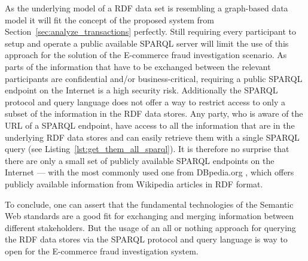 As the underlying model of a \gls{RDF} data set is resembling a graph-based data model it will fit the concept of the proposed system from Section~\ref{sec:analyze_transactions} perfectly. Still requiring every participant to setup and operate a public available \gls{SPARQL} server will limit the use of this approach for the solution of the \gls{E-commerce} fraud investigation scenario. As parts of the information that have to be exchanged between the relevant participants are confidential and/or business-critical, requiring a public \gls{SPARQL} endpoint on the Internet is a high security risk. Additionally the \gls{SPARQL} protocol and query language does not offer a way to restrict access to only a subset of the information in the \gls{RDF} data stores. Any party, who is aware of the \gls{URL} of a \gls{SPARQL} endpoint, have access to all the information that are in the underlying \gls{RDF} data stores and can easily retrieve them with a single \gls{SPARQL} query (see Listing~\ref{lst:get_them_all_sparql}). It is therefore no surprise that there are only a small set of publicly available \gls{SPARQL} endpoints on the Internet --- with the most commonly used one from DBpedia.org \citep{dbPedia.org}, which offers publicly available information from Wikipedia articles in \gls{RDF} format. \@


To conclude, one can assert that the fundamental technologies of the Semantic Web standards are a good fit for exchanging and merging information between different stakeholders. But the usage of an all or nothing approach for querying the \gls{RDF} data stores via the \gls{SPARQL} protocol and query language is way to open for the \gls{E-commerce} fraud investigation system.


